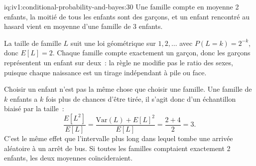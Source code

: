 \begin{solution}{iq:iv1:conditional-probability-and-bayes:30}
Une famille compte en moyenne 2 enfants, la moitié de tous les enfants sont des garçons, et un enfant rencontré au hasard vient en moyenne d'une famille de 3 enfants.

La taille de famille $L$ suit une loi géométrique sur $1, 2, \dots$ avec $P(L = k) = 2^{-k}$, donc $E[L] = 2$. Chaque famille compte exactement un garçon, donc les garçons représentent un enfant sur deux~: la règle ne modifie pas le ratio des sexes, puisque chaque naissance est un tirage indépendant à pile ou face.

Choisir un enfant n'est pas la même chose que choisir une famille. Une famille de $k$ enfants a $k$ fois plus de chances d'être tirée, il s'agit donc d'un échantillon biaisé par la taille~:
\[
\frac{E[L^2]}{E[L]} = \frac{\mathrm{Var}(L) + E[L]^2}{E[L]} = \frac{2 + 4}{2} = 3.
\]
C'est le même effet que l'intervalle plus long dans lequel tombe une arrivée aléatoire à un arrêt de bus. Si toutes les familles comptaient exactement 2 enfants, les deux moyennes coïncideraient.

\end{solution}


